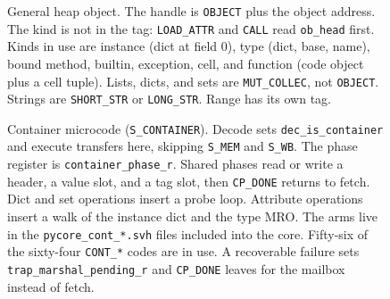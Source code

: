 \begin{figure}[htbp]
\centering
{}
\caption{General heap object.
The handle is \texttt{OBJECT} plus the object address.
The kind is not in the tag: \texttt{LOAD\_ATTR} and \texttt{CALL} read \texttt{ob\_head} first.
Kinds in use are instance (dict at field 0), type (dict, base, name), bound method, builtin, exception, cell, and function (code object plus a cell tuple).
Lists, dicts, and sets are \texttt{MUT\_COLLEC}, not \texttt{OBJECT}.
Strings are \texttt{SHORT\_STR} or \texttt{LONG\_STR}.
Range has its own tag.}
\label{fig:object}
\end{figure}

\begin{figure}[htbp]
\centering
{}
\caption{Container microcode (\texttt{S\_CONTAINER}).
Decode sets \texttt{dec\_is\_container} and execute transfers here, skipping \texttt{S\_MEM} and \texttt{S\_WB}.
The phase register is \texttt{container\_phase\_r}.
Shared phases read or write a header, a value slot, and a tag slot, then \texttt{CP\_DONE} returns to fetch.
Dict and set operations insert a probe loop.
Attribute operations insert a walk of the instance dict and the type MRO.
The arms live in the \texttt{pycore\_cont\_*.svh} files included into the core.
Fifty-six of the sixty-four \texttt{CONT\_*} codes are in use.
A recoverable failure sets \texttt{trap\_marshal\_pending\_r} and \texttt{CP\_DONE} leaves for the mailbox instead of fetch.}
\label{fig:contfsm}
\end{figure}

